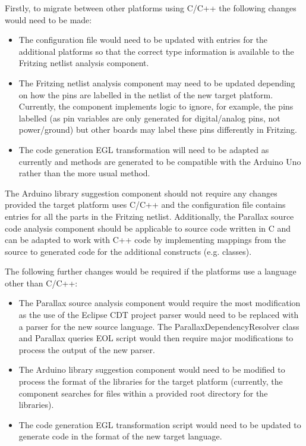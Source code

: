 \documentclass{UoYCSproject}
\begin{document}
Firstly, to migrate between other platforms using C/C++ the following changes would need to be made:
\begin{itemize}
\item The configuration file would need to be updated with entries for the additional platforms so that the correct type information is available to the Fritzing netlist analysis component.
\item The Fritzing netlist analysis component may need to be updated depending on how the pins are labelled in the netlist of the new target platform. Currently, the component implements logic to ignore, for example, the pins labelled  (as pin variables are only generated for digital/analog pins, not power/ground) but other boards may label these pins differently in Fritzing.
\item The code generation EGL transformation will need to be adapted as currently  and  methods are generated to be compatible with the Arduino Uno rather than the more usual  method.
\end{itemize}

The Arduino library suggestion component should not require any changes provided the target platform uses C/C++ and the configuration file contains entries for all the parts in the Fritzing netlist. Additionally, the Parallax source code analysis component should be applicable to  source code written in C and can be adapted to work with C++ code by implementing mappings from the source to generated code for the additional constructs (e.g. classes).

The following further changes would be required if the platforms use a language other than C/C++:
\begin{itemize}
\item The Parallax source analysis component would require the most modification as the use of the Eclipse CDT project parser would need to be replaced with a parser for the new source language. The ParallaxDependencyResolver class and Parallax queries EOL script would then require major modifications to process the output of the new parser.
\item The Arduino library suggestion component would need to be modified to process the format of the libraries for the target platform (currently, the component searches for  files within a provided root directory for the libraries).
\item The code generation EGL transformation script would need to be updated to generate code in the format of the new target language.
\end{itemize}
\end{document}
